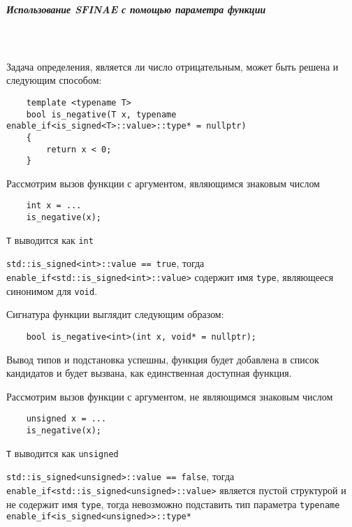 \subparagraph{Использование SFINAE с помощью параметра функции \ \ \ \ \ \ \ \ \ \ \ \ \ \ \ \ \ \ \ \ \ \ \ \ \ \ \ \ \ \ \ \ \ \ \ \ \ \ \ \ \ \ \ \ \ \ \ \ \ \ \ \ \ \ \ \ \ \ \ \ \ \ \ \ \ \ \ \ \ \ \ \ \ \ \ \ \ \ \ \ \ \ \ \ \ \ \ \ \ \ \ \ \ \ \ \ \ \ \ \ \ }

	
	Задача определения, является ли число отрицательным, может быть решена и следующим способом:
	
	\begin{verbatim}
	template <typename T>
	bool is_negative(T x, typename enable_if<is_signed<T>::value>::type* = nullptr)
	{
		return x < 0;
	}
	\end{verbatim}
	
	Рассмотрим вызов функции с аргументом, являющимся знаковым числом
	
	\begin{verbatim}
	int x = ...
	is_negative(x);
	\end{verbatim}
	
	\texttt{T} выводится как \texttt{int}
	
	\texttt{std::is_signed<int>::value == true}, тогда \texttt{enable_if<std::is_signed<int>::value>} содержит имя \texttt{type}, являющееся синонимом для \texttt{void}.
	
	Сигнатура функции выглядит следующим образом:
	
	\begin{verbatim}
	bool is_negative<int>(int x, void* = nullptr);
	\end{verbatim}
	
	Вывод типов и подстановка успешны, функция будет добавлена в список кандидатов и будет вызвана, как единственная доступная функция.
	
	Рассмотрим вызов функции с аргументом, не являющимся знаковым числом
	
	\begin{verbatim}
	unsigned x = ...
	is_negative(x);
	\end{verbatim}
	
	\texttt{T} выводится как \texttt{unsigned}
	
	\texttt{std::is_signed<unsigned>::value == false}, тогда \texttt{enable_if<std::is_signed<unsigned>::value>} является пустой структурой и не содержит имя \texttt{type}, тогда невозможно подставить тип параметра \texttt{typename enable_if<is_signed<unsigned>>::type*}
	
